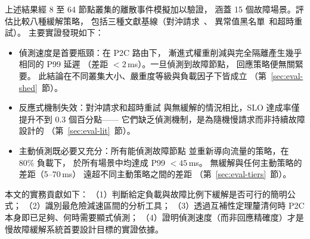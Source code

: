 上述結果經 8 至 64 節點叢集的離散事件模擬加以驗證，
涵蓋 15 個故障場景。評估比較八種緩解策略，
包括三種文獻基線（對沖請求~\cite{dean2013tail}、
異常值黑名單~\cite{lakshman2010cassandra}和超時重試）。
主要實證發現如下：

\begin{itemize}
\item 偵測速度是首要瓶頸：在 P2C 路由下，
  漸進式權重削減與完全隔離產生幾乎相同的 P99 延遲
  （差距 $< 2$\,ms）。一旦偵測到故障節點，
  回應策略便無關緊要。
  此結論在不同叢集大小、嚴重度等級與負載因子下皆成立
  （第~\ref{sec:eval-shed}~節）。

\item 反應式機制失效：對沖請求和超時重試
  與無緩解的情況相比，SLO 達成率僅提升不到 0.3 個百分點——
  它們缺乏偵測機制，是為隨機慢請求而非持續故障設計的
  （第~\ref{sec:eval-lit}~節）。

\item 主動偵測既必要又充分：所有能偵測故障節點
  並重新導向流量的策略，在 80\% 負載下，
  於所有場景中均達成 P99 $< 45$\,ms。
  無緩解與任何主動策略的差距（5--70\,ms）
  遠超不同主動策略之間的差距
  （第~\ref{sec:eval-tiers}~節）。
\end{itemize}

本文的實務貢獻如下：
（1）判斷給定負載與故障比例下緩解是否可行的簡明公式；
（2）識別最危險減速區間的分析工具；
（3）透過互補性定理釐清何時 P2C 本身即已足夠、何時需要顯式偵測；
（4）證明偵測速度（而非回應精確度）才是慢故障緩解系統首要設計目標的實證依據。
